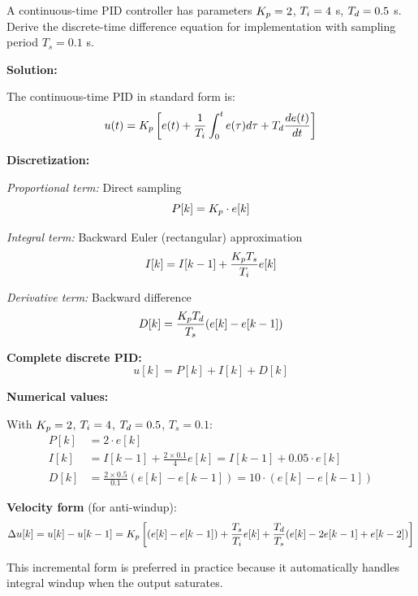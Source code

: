 \begin{example}
\label{ex:digital_pid}
A continuous-time PID controller has parameters $K_p = 2$, $T_i = 4$ s, $T_d = 0.5$ s. Derive the discrete-time difference equation for implementation with sampling period $T_s = 0.1$ s.

\textbf{Solution:}

The continuous-time PID in standard form is:
\begin{equation*}
u(t) = K_p \left[ e(t) + \frac{1}{T_i} \int_0^t e(\tau) d\tau + T_d \frac{de(t)}{dt} \right]
\end{equation*}

\textbf{Discretization:}

\textit{Proportional term:} Direct sampling
\begin{equation*}
P[k] = K_p \cdot e[k]
\end{equation*}

\textit{Integral term:} Backward Euler (rectangular) approximation
\begin{equation*}
I[k] = I[k-1] + \frac{K_p T_s}{T_i} e[k]
\end{equation*}

\textit{Derivative term:} Backward difference
\begin{equation*}
D[k] = \frac{K_p T_d}{T_s} (e[k] - e[k-1])
\end{equation*}

\textbf{Complete discrete PID:}
\begin{equation*}
u[k] = P[k] + I[k] + D[k]
\end{equation*}

\textbf{Numerical values:}

With $K_p = 2$, $T_i = 4$, $T_d = 0.5$, $T_s = 0.1$:
\begin{align*}
P[k] &= 2 \cdot e[k] \\
I[k] &= I[k-1] + \frac{2 \times 0.1}{4} e[k] = I[k-1] + 0.05 \cdot e[k] \\
D[k] &= \frac{2 \times 0.5}{0.1} (e[k] - e[k-1]) = 10 \cdot (e[k] - e[k-1])
\end{align*}

\textbf{Velocity form} (for anti-windup):
\begin{equation*}
\Delta u[k] = u[k] - u[k-1] = K_p\left[(e[k]-e[k-1]) + \frac{T_s}{T_i}e[k] + \frac{T_d}{T_s}(e[k] - 2e[k-1] + e[k-2])\right]
\end{equation*}

This incremental form is preferred in practice because it automatically handles integral windup when the output saturates.
\end{example}


